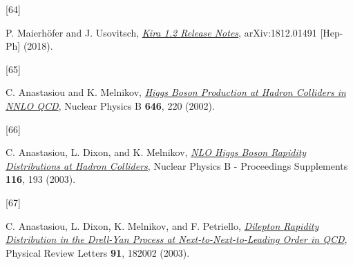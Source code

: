 \documentclass[
  10pt,
  a4paper,
  DIV=11,
  numbers=noendperiod,
  twoside]{scrreprt}
\newlength{\cslhangindent}
\newlength{\csllabelwidth}
\newlength{\cslentryspacingunit} %
\newenvironment{CSLReferences}[2] %
 {%
  \setlength{\parindent}{0pt}
  \ifodd #1
  \let\oldpar\par
  \def\par{\hangindent=\cslhangindent\oldpar}
  \fi
  \setlength{\parskip}{#2\cslentryspacingunit}
 }%
 {}
\newcommand{\CSLLeftMargin}[1]{\parbox[t]{\csllabelwidth}{#1}}
\newcommand{\CSLRightInline}[1]{\parbox[t]{\linewidth - \csllabelwidth}{#1}\break}
\DeclareRobustCommand{\[}{\begin{equation}}
\DeclareRobustCommand{\]}{\end{equation}}
\begin{document}
\begin{CSLReferences}{0}{0}
\leavevmode{}%
\CSLLeftMargin{{[}64{]} }%
\CSLRightInline{P. Maierhöfer and J. Usovitsch,
\emph{\href{https://arxiv.org/abs/1812.01491}{Kira 1.2 {Release
Notes}}}, arXiv:1812.01491 {[}Hep-Ph{]} (2018).}

\leavevmode{}%
\CSLLeftMargin{{[}65{]} }%
\CSLRightInline{C. Anastasiou and K. Melnikov,
\emph{\href{https://doi.org/10.1016/S0550-3213(02)00837-4}{Higgs Boson
Production at Hadron Colliders in {NNLO QCD}}}, Nuclear Physics B
\textbf{646}, 220 (2002).}

\leavevmode{}%
\CSLLeftMargin{{[}66{]} }%
\CSLRightInline{C. Anastasiou, L. Dixon, and K. Melnikov,
\emph{\href{https://doi.org/10.1016/S0920-5632(03)80168-8}{{NLO Higgs}
Boson Rapidity Distributions at Hadron Colliders}}, Nuclear Physics B -
Proceedings Supplements \textbf{116}, 193 (2003).}

\leavevmode{}%
\CSLLeftMargin{{[}67{]} }%
\CSLRightInline{C. Anastasiou, L. Dixon, K. Melnikov, and F. Petriello,
\emph{\href{https://doi.org/10.1103/PhysRevLett.91.182002}{Dilepton
{Rapidity Distribution} in the {Drell-Yan Process} at
{Next-to-Next-to-Leading Order} in {QCD}}}, Physical Review Letters
\textbf{91}, 182002 (2003).}

\end{CSLReferences}
\end{document}
